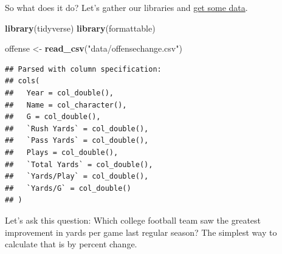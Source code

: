 \documentclass[]{book}
\newenvironment{Shaded}{\begin{snugshade}}{\end{snugshade}}
\newcommand{\DataTypeTok}[1]{\textcolor[rgb]{0.13,0.29,0.53}{#1}}
\newcommand{\DecValTok}[1]{\textcolor[rgb]{0.00,0.00,0.81}{#1}}
\newcommand{\KeywordTok}[1]{\textcolor[rgb]{0.13,0.29,0.53}{\textbf{#1}}}
\newcommand{\NormalTok}[1]{#1}
\newcommand{\OperatorTok}[1]{\textcolor[rgb]{0.81,0.36,0.00}{\textbf{#1}}}
\newcommand{\StringTok}[1]{\textcolor[rgb]{0.31,0.60,0.02}{#1}}
\begin{document}
So what does it do? Let's gather our libraries and \href{https://unl.box.com/s/g3eeuogx8bog72ig28enuakhpdlbn394}{get some data}.

\begin{Shaded}
\begin{Highlighting}[]
\KeywordTok{library}\NormalTok{(tidyverse)}
\KeywordTok{library}\NormalTok{(formattable)}
\end{Highlighting}
\end{Shaded}

\begin{Shaded}
\begin{Highlighting}[]
\NormalTok{offense <-}\StringTok{ }\KeywordTok{read_csv}\NormalTok{(}\StringTok{"data/offensechange.csv"}\NormalTok{)}
\end{Highlighting}
\end{Shaded}

\begin{verbatim}
## Parsed with column specification:
## cols(
##   Year = col_double(),
##   Name = col_character(),
##   G = col_double(),
##   `Rush Yards` = col_double(),
##   `Pass Yards` = col_double(),
##   Plays = col_double(),
##   `Total Yards` = col_double(),
##   `Yards/Play` = col_double(),
##   `Yards/G` = col_double()
## )
\end{verbatim}

Let's ask this question: Which college football team saw the greatest improvement in yards per game last regular season? The simplest way to calculate that is by percent change.

\begin{Shaded}
\end{Shaded}
\end{document}
